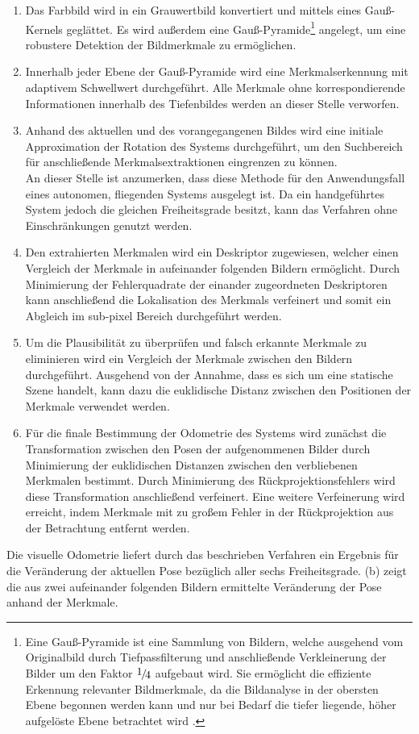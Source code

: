 \begin{enumerate}
\item Das Farbbild wird in ein Grauwertbild konvertiert und mittels eines Gauß-Kernels geglättet. Es wird außerdem eine Gauß-Pyramide\footnote{Eine Gauß-Pyramide ist eine Sammlung von Bildern, welche ausgehend vom Originalbild durch Tiefpassfilterung und anschließende Verkleinerung der Bilder um den Faktor $\nicefrac{1}{4}$ aufgebaut wird. Sie ermöglicht die effiziente Erkennung relevanter Bildmerkmale, da die Bildanalyse in der obersten Ebene begonnen werden kann und nur bei Bedarf die tiefer liegende, höher aufgelöste Ebene betrachtet wird \cite{Nischwitz20112}.} angelegt, um eine robustere Detektion der Bildmerkmale zu ermöglichen.
\item Innerhalb jeder Ebene der Gauß-Pyramide wird eine Merkmalserkennung mit adaptivem Schwellwert durchgeführt. Alle Merkmale ohne korrespondierende Informationen innerhalb des Tiefenbildes werden an dieser Stelle verworfen.
\item Anhand des aktuellen und des vorangegangenen Bildes wird eine initiale Approximation der Rotation des Systems durchgeführt, um den Suchbereich für anschließende Merkmalsextraktionen eingrenzen zu können.\\
An dieser Stelle ist anzumerken, dass diese Methode für den Anwendungsfall eines autonomen, fliegenden Systems ausgelegt ist. Da ein handgeführtes System jedoch die gleichen Freiheitsgrade besitzt, kann das Verfahren ohne Einschränkungen genutzt werden.
\item Den extrahierten Merkmalen wird ein Deskriptor zugewiesen, welcher einen Vergleich der Merkmale in aufeinander folgenden Bildern ermöglicht. Durch Minimierung der Fehlerquadrate der einander zugeordneten Deskriptoren kann anschließend die Lokalisation des Merkmals verfeinert und somit ein Abgleich im sub-pixel Bereich durchgeführt werden.
\item Um die Plausibilität zu überprüfen und falsch erkannte Merkmale zu eliminieren wird ein Vergleich der Merkmale zwischen den Bildern durchgeführt. Ausgehend von der Annahme, dass es sich um eine statische Szene handelt, kann dazu die euklidische Distanz zwischen den Positionen der Merkmale verwendet werden.
\item Für die finale Bestimmung der Odometrie des Systems wird zunächst die Transformation zwischen den Posen der aufgenommenen Bilder durch Minimierung der euklidischen Distanzen zwischen den verbliebenen Merkmalen bestimmt. Durch Minimierung des Rückprojektionsfehlers wird diese Transformation anschließend verfeinert. Eine weitere Verfeinerung wird erreicht, indem Merkmale mit zu großem Fehler in der Rückprojektion aus der Betrachtung entfernt werden.
\end{enumerate}
Die visuelle Odometrie liefert durch das beschrieben Verfahren ein Ergebnis für die Veränderung der aktuellen Pose bezüglich aller sechs Freiheitsgrade.  (b) zeigt die aus zwei aufeinander folgenden Bildern ermittelte Veränderung der Pose anhand der Merkmale.\\


